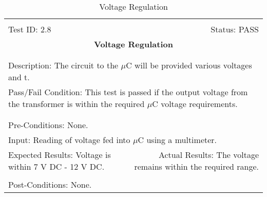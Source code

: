 \documentclass[titlepage]{article}
\begin{document}
\begin{center}
\begin{table}[h!]
\begin{tabular}{|l r|}\hline&\\[-2mm]
	Test ID: 2.8	&Status: PASS\\[-3mm]
	\multicolumn{2}{|c|}{\textbf{\large{Voltage Regulation}}}\\&\\\hline&\\[-3mm]
	\multicolumn{2}{|p{\textwidth}|}{Description: The circuit to the $\mu$C will be provided various voltages and t.}\\[1mm]
	\multicolumn{2}{|p{\textwidth}|}{Pass/Fail Condition: This test is passed if the output voltage from the transformer is within the required $\mu$C voltage requirements.}\\[1mm]\hline&\\[-3mm]\hline&\\[-3mm]
	\multicolumn{2}{|p{\textwidth}|}{Pre-Conditions: None.}\\[4mm]
	\multicolumn{2}{|p{\textwidth}|}{Input: Reading of voltage fed into $\mu$C using a multimeter.}\\[2mm]\hline
	\multicolumn{1}{|p{0.49\textwidth}}{Expected Results: Voltage is within 7 V DC - 12 V DC.}	&\multicolumn{1}{|p{0.45\textwidth}|}{Actual Results: The voltage remains within the required range.}\\\hline&\\[-3mm]
	\multicolumn{2}{|p{\textwidth}|}{Post-Conditions: None.}\\\hline
\end{tabular}
\caption{Voltage Regulation}
\end{table}
\end{center}
\end{document}
